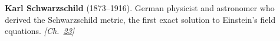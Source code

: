 \textbf{Karl Schwarzschild} (1873–1916). German physicist and astronomer who derived the Schwarzschild metric, the first exact solution to Einstein's field equations. \emph{[Ch.~\hyperref[ch:blackholetimedilationredshift]{23}]}

